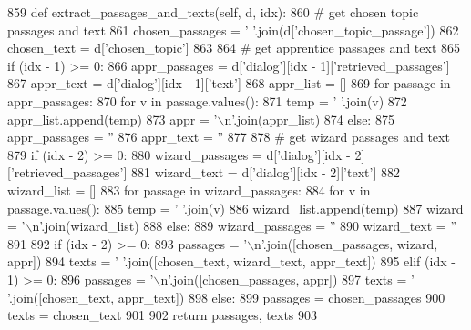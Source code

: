 \begin{DoxyCode}
859     \textcolor{keyword}{def }extract\_passages\_and\_texts(self, d, idx):
860         \textcolor{comment}{# get chosen topic passages and text}
861         chosen\_passages = \textcolor{stringliteral}{' '}.join(d[\textcolor{stringliteral}{'chosen\_topic\_passage'}])
862         chosen\_text = d[\textcolor{stringliteral}{'chosen\_topic'}]
863 
864         \textcolor{comment}{# get apprentice passages and text}
865         \textcolor{keywordflow}{if} (idx - 1) >= 0:
866             appr\_passages = d[\textcolor{stringliteral}{'dialog'}][idx - 1][\textcolor{stringliteral}{'retrieved\_passages'}]
867             appr\_text = d[\textcolor{stringliteral}{'dialog'}][idx - 1][\textcolor{stringliteral}{'text'}]
868             appr\_list = []
869             \textcolor{keywordflow}{for} passage \textcolor{keywordflow}{in} appr\_passages:
870                 \textcolor{keywordflow}{for} v \textcolor{keywordflow}{in} passage.values():
871                     temp = \textcolor{stringliteral}{' '}.join(v)
872                     appr\_list.append(temp)
873             appr = \textcolor{stringliteral}{'\(\backslash\)n'}.join(appr\_list)
874         \textcolor{keywordflow}{else}:
875             appr\_passages = \textcolor{stringliteral}{''}
876             appr\_text = \textcolor{stringliteral}{''}
877 
878         \textcolor{comment}{# get wizard passages and text}
879         \textcolor{keywordflow}{if} (idx - 2) >= 0:
880             wizard\_passages = d[\textcolor{stringliteral}{'dialog'}][idx - 2][\textcolor{stringliteral}{'retrieved\_passages'}]
881             wizard\_text = d[\textcolor{stringliteral}{'dialog'}][idx - 2][\textcolor{stringliteral}{'text'}]
882             wizard\_list = []
883             \textcolor{keywordflow}{for} passage \textcolor{keywordflow}{in} wizard\_passages:
884                 \textcolor{keywordflow}{for} v \textcolor{keywordflow}{in} passage.values():
885                     temp = \textcolor{stringliteral}{' '}.join(v)
886                     wizard\_list.append(temp)
887             wizard = \textcolor{stringliteral}{'\(\backslash\)n'}.join(wizard\_list)
888         \textcolor{keywordflow}{else}:
889             wizard\_passages = \textcolor{stringliteral}{''}
890             wizard\_text = \textcolor{stringliteral}{''}
891 
892         \textcolor{keywordflow}{if} (idx - 2) >= 0:
893             passages = \textcolor{stringliteral}{'\(\backslash\)n'}.join([chosen\_passages, wizard, appr])
894             texts = \textcolor{stringliteral}{' '}.join([chosen\_text, wizard\_text, appr\_text])
895         \textcolor{keywordflow}{elif} (idx - 1) >= 0:
896             passages = \textcolor{stringliteral}{'\(\backslash\)n'}.join([chosen\_passages, appr])
897             texts = \textcolor{stringliteral}{' '}.join([chosen\_text, appr\_text])
898         \textcolor{keywordflow}{else}:
899             passages = chosen\_passages
900             texts = chosen\_text
901 
902         \textcolor{keywordflow}{return} passages, texts
903 
\end{DoxyCode}
